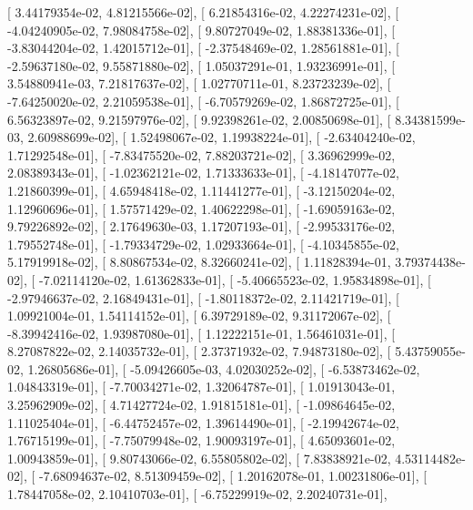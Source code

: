 \documentclass{article}
\begin{document}
       [  3.44179354e-02,   4.81215566e-02],
       [  6.21854316e-02,   4.22274231e-02],
       [ -4.04240905e-02,   7.98084758e-02],
       [  9.80727049e-02,   1.88381336e-01],
       [ -3.83044204e-02,   1.42015712e-01],
       [ -2.37548469e-02,   1.28561881e-01],
       [ -2.59637180e-02,   9.55871880e-02],
       [  1.05037291e-01,   1.93236991e-01],
       [  3.54880941e-03,   7.21817637e-02],
       [  1.02770711e-01,   8.23723239e-02],
       [ -7.64250020e-02,   2.21059538e-01],
       [ -6.70579269e-02,   1.86872725e-01],
       [  6.56323897e-02,   9.21597976e-02],
       [  9.92398261e-02,   2.00850698e-01],
       [  8.34381599e-03,   2.60988699e-02],
       [  1.52498067e-02,   1.19938224e-01],
       [ -2.63404240e-02,   1.71292548e-01],
       [ -7.83475520e-02,   7.88203721e-02],
       [  3.36962999e-02,   2.08389343e-01],
       [ -1.02362121e-02,   1.71333633e-01],
       [ -4.18147077e-02,   1.21860399e-01],
       [  4.65948418e-02,   1.11441277e-01],
       [ -3.12150204e-02,   1.12960696e-01],
       [  1.57571429e-02,   1.40622298e-01],
       [ -1.69059163e-02,   9.79226892e-02],
       [  2.17649630e-03,   1.17207193e-01],
       [ -2.99533176e-02,   1.79552748e-01],
       [ -1.79334729e-02,   1.02933664e-01],
       [ -4.10345855e-02,   5.17919918e-02],
       [  8.80867534e-02,   8.32660241e-02],
       [  1.11828394e-01,   3.79374438e-02],
       [ -7.02114120e-02,   1.61362833e-01],
       [ -5.40665523e-02,   1.95834898e-01],
       [ -2.97946637e-02,   2.16849431e-01],
       [ -1.80118372e-02,   2.11421719e-01],
       [  1.09921004e-01,   1.54114152e-01],
       [  6.39729189e-02,   9.31172067e-02],
       [ -8.39942416e-02,   1.93987080e-01],
       [  1.12222151e-01,   1.56461031e-01],
       [  8.27087822e-02,   2.14035732e-01],
       [  2.37371932e-02,   7.94873180e-02],
       [  5.43759055e-02,   1.26805686e-01],
       [ -5.09426605e-03,   4.02030252e-02],
       [ -6.53873462e-02,   1.04843319e-01],
       [ -7.70034271e-02,   1.32064787e-01],
       [  1.01913043e-01,   3.25962909e-02],
       [  4.71427724e-02,   1.91815181e-01],
       [ -1.09864645e-02,   1.11025404e-01],
       [ -6.44752457e-02,   1.39614490e-01],
       [ -2.19942674e-02,   1.76715199e-01],
       [ -7.75079948e-02,   1.90093197e-01],
       [  4.65093601e-02,   1.00943859e-01],
       [  9.80743066e-02,   6.55805802e-02],
       [  7.83838921e-02,   4.53114482e-02],
       [ -7.68094637e-02,   8.51309459e-02],
       [  1.20162078e-01,   1.00231806e-01],
       [  1.78447058e-02,   2.10410703e-01],
       [ -6.75229919e-02,   2.20240731e-01],
\end{document}
